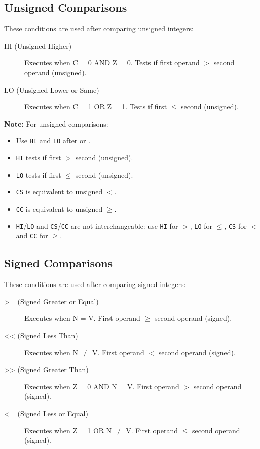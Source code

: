\subsection{Unsigned Comparisons}

These conditions are used after comparing unsigned integers:

\begin{description}
	\item[HI (Unsigned Higher)] Executes when C = 0 AND Z = 0. Tests if first operand $>$ second operand (unsigned).

	\item[LO (Unsigned Lower or Same)] Executes when C = 1 OR Z = 1. Tests if first $\leq$ second (unsigned).
\end{description}

\textbf{Note:} For unsigned comparisons:
\begin{itemize}
	\item Use \texttt{HI} and \texttt{LO} after  or .
	\item \texttt{HI} tests if first $>$ second (unsigned).
	\item \texttt{LO} tests if first $\leq$ second (unsigned).
	\item \texttt{CS} is equivalent to unsigned $<$.
	\item \texttt{CC} is equivalent to unsigned $\geq$.
	\item \texttt{HI}/\texttt{LO} and \texttt{CS}/\texttt{CC} are not interchangeable: use \texttt{HI} for $>$,
	      \texttt{LO} for $\leq$, \texttt{CS} for $<$ and \texttt{CC} for $\geq$.
\end{itemize}

\subsection{Signed Comparisons}

These conditions are used after comparing signed integers:

\begin{description}
	\item[>= (Signed Greater or Equal)] Executes when N = V. First operand $\geq$ second operand (signed).

	\item[<< (Signed Less Than)] Executes when N $\neq$ V. First operand $<$ second operand (signed).

	\item[>> (Signed Greater Than)] Executes when Z = 0 AND N = V. First operand $>$ second operand (signed).

	\item[<= (Signed Less or Equal)] Executes when Z = 1 OR N $\neq$ V. First operand $\leq$ second operand (signed).
\end{description}

